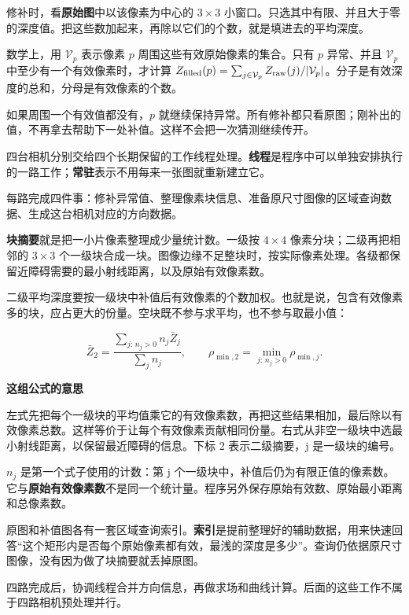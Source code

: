 \documentclass[12pt,a4paper]{article}
\numberwithin{equation}{topic}
\begin{document}
修补时，看\textbf{原始图}中以该像素为中心的 \(3\times3\) 小窗口。只选其中有限、并且大于零的深度值。把这些数加起来，再除以它们的个数，就是填进去的平均深度。

数学上，用 \(\mathcal V_p\) 表示像素 \(p\) 周围这些有效原始像素的集合。只有 \(p\) 异常、并且 \(\mathcal V_p\) 中至少有一个有效像素时，才计算 \(Z_{\rm filled}(p)=\sum_{j\in\mathcal V_p} Z_{\rm raw}(j)/|\mathcal V_p|\)。分子是有效深度的总和，分母是有效像素的个数。

如果周围一个有效值都没有，\(p\) 就继续保持异常。所有修补都只看原图；刚补出的值，不再拿去帮助下一处补值。这样不会把一次猜测继续传开。

四台相机分别交给四个长期保留的工作线程处理。\textbf{线程}是程序中可以单独安排执行的一路工作；\textbf{常驻}表示不用每来一张图就重新建立它。

每路完成四件事：修补异常值、整理像素块信息、准备原尺寸图像的区域查询数据、生成这台相机对应的方向数据。

\textbf{块摘要}就是把一小片像素整理成少量统计数。一级按 \(4\times4\) 像素分块；二级再把相邻的 \(3\times3\) 个一级块合成一块。图像边缘不足整块时，按实际像素处理。各级都保留近障碍需要的最小射线距离，以及原始有效像素数。

二级平均深度要按一级块中补值后有效像素的个数加权。也就是说，包含有效像素多的块，应占更大的份量。空块既不参与求平均，也不参与取最小值：

\begin{equation}
\label{eq:pool}
\bar Z_2=\frac{\sum_{j:\,n_j>0} n_j\bar Z_j}{\sum_j n_j},
\qquad
\rho_{\min,2}=\min_{j:\,n_j>0}\rho_{\min,j}.
\end{equation}

\noindent\textbf{这组公式的意思}\par\nobreak
左式先把每个一级块的平均值乘它的有效像素数，再把这些结果相加，最后除以有效像素总数。这样等价于让每个有效像素贡献相同份量。右式从非空一级块中选最小射线距离，以保留最近障碍的信息。下标 2 表示二级摘要，j 是一级块的编号。


\(n_j\) 是第一个式子使用的计数：第 j 个一级块中，补值后仍为有限正值的像素数。它与\textbf{原始有效像素数}不是同一个统计量。程序另外保存原始有效数、原始最小距离和总像素数。

原图和补值图各有一套区域查询索引。\textbf{索引}是提前整理好的辅助数据，用来快速回答“这个矩形内是否每个原始像素都有效，最浅的深度是多少”。查询仍依据原尺寸图像，没有因为做了块摘要就丢掉原图。

四路完成后，协调线程合并方向信息，再做求场和曲线计算。后面的这些工作不属于四路相机预处理并行。
\end{document}
